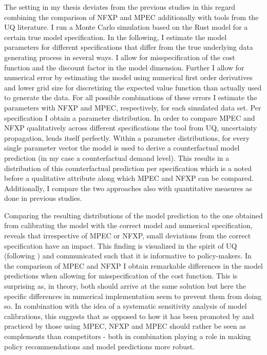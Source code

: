 The setting in my thesis deviates from the previous studies in this regard combining the comparison of NFXP and MPEC additionally with tools from the UQ literature. I run a Monte Carlo simulation based on the Rust model for a certain true model specification. In the following, I estimate the model parameters for different specifications that differ from the true underlying data generating process in several ways. I allow for misspecification of the cost function and the discount factor in the model dimension. Further I allow for numerical error by estimating the model using numerical first order derivatives and lower grid size for discretizing the expected value function than actually used to generate the data. For all possible combinations of these errors I estimate the parameters with NFXP and MPEC, respectively, for each simulated data set. Per specification I obtain a parameter distribution. In order to compare MPEC and NFXP qualitatively across different specifications the tool from UQ, uncertainty propagation, lends itself perfectly. Within a parameter distributions, for every single parameter vector the model is used to derive a counterfactual model prediction (in my case a counterfactual demand level). This results in a distribution of this counterfactual prediction per specification which is a noted before a qualitative attribute along which MPEC and NFXP can be compared. Additionally, I compare the two approaches also with quantitative measures as done in previous studies.

Comparing the resulting distributions of the model prediction to the one obtained from calibrating the model with the correct model and numerical specification, reveals that irrespective of MPEC or NFXP, small deviations from the correct specification have an impact. This finding is visualized in the spirit of UQ (following \cite{Oberkampf.2010}) and communicated such that it is informative to policy-makers. In the comparison of MPEC and NFXP I obtain remarkable differences in the model predictions when allowing for misspecification of the cost function. This is surprising as, in theory, both should arrive at the same solution but here the specific differences in numerical implementation seem to prevent them from doing so. In combination with the idea of a systematic sensitivity analysis of model calibrations, this suggests that as opposed to how it has been promoted by \cite{Su.Judd.2012} and practiced by those using MPEC, NFXP and MPEC should rather be seen as complements than competitors - both in combination playing a role in making policy recommendations and model predictions more robust.

